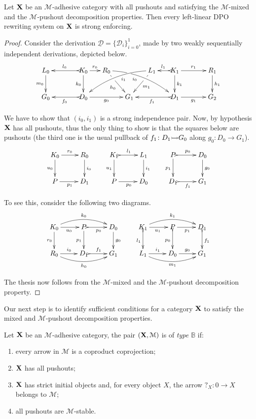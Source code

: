 \documentclass[a4paper,UKenglish,cleveref,pdftex, thm-restate,numberwithinsect,anonymous]{lipics}
\newcommand{\mto}[0]{\scalebox{1}{$\rightarrowtail$}}
\def\X{\textbf {\textup{X}}}
\def\G{\textbf {\textup{G}}}
\newcommand{\dder}[1]{\mathscr{#1}}
\newcommand{\der}[1]{\underline{\dder{#1}}}
\begin{document}
\begin{theorem}\label{thm:good1}Let $\X$ be an $\mathcal{M}$-adhesive category with all pushouts and satisfying the $\mathcal{M}$-mixed and the $\mathcal{M}$-pushout decomposition properties. Then every left-linear DPO rewriting system on $\X$ is strong enforcing.
\end{theorem}
\begin{proof}
	Consider the derivation $\der{D}=\{\dder{D}_i\}_{i=0}^1$, made by two weakly sequentially independent derivations, depicted below.
	\[\xymatrix@C=15pt{L_0 \ar[d]_{m_0}&& K_0 \ar[d]_{k_0}\ar@{>->}[ll]_{l_0} \ar[r]^{r_0} & R_0 \ar@/^.35cm/[drrr]|(.3)\hole_(.4){i_0} \ar[dr]|(.3)\hole_{h_0} && L_1 \ar@/_.35cm/[dlll]^(.4){i_1} \ar[dl]|(.3)\hole^{m_1}& K_1 \ar[d]^{k_1}\ar@{>->}[l]_{l_1} \ar[rr]^{r_1} && R_1 \ar[d]^{h_1} \\G_0 && \ar@{>->}[ll]^{f_0} D_0 \ar[rr]_{g_0}&& G_1  && \ar@{>->}[ll]^{f_1} D_1 \ar[rr]_{g_1}&& G_2 }\]

	We have to show that $(i_0, i_1)$ is a strong independence pair. Now, by hypothesis $\X$ has all pushouts, thus the only thing to show is that the squares below are pushouts (the third one is the usual pullback of $f_1\colon D_1\mto G_0$ along $g_0\colon D_0\to G_1$).
	\[\xymatrix{K_0 \ar[r]^{r_0}  \ar[d]_{u_0}& R_0 \ar[d]^{i_0} & K_1 \ar@{>->}[r]^{l_1}  \ar[d]_{u_1}& L_1 \ar[d]^{i_1}&P \ar@{>->}[r]^{p_0} \ar[d]_{p_1}& D_0\ar[d]^{g_0} \\ P \ar[r]_{p_1} & D_1 &P \ar[r]_{p_0}  & D_0&D_1 \ar@{>->}[r]_{f_1} & G_1}\]

	To see this, consider the following two diagrams.
	\[\xymatrix{K_0 \ar@/^.4cm/[rr]^{k_0} \ar[d]_{r_0} \ar[r]_{u_0}& \ar@{>->}[r]_{p_0} P \ar[d]_{p_1}& D_0 \ar[d]^{g_0}&K_1 \ar@/^.4cm/[rr]^{k_1} \ar@{>->}[d]_{l_1} \ar[r]_{u_1}& \ar[r]_{p_1} P \ar@{>->}[d]_{p_0}& D_1 \ar@{>->}[d]^{f_1}\\ R_0 \ar@/_.4cm/[rr]_{h_0}  \ar[r]^{i_0}& D_1 \ar@{>->}[r]^{f_1}& G_1 &L_1 \ar@/_.4cm/[rr]_{m_1}  \ar[r]^{i_1}& D_0 \ar[r]^{g_0}& G_1}\]

	The thesis now follows from the $\mathcal{M}$-mixed and the $\mathcal{M}$-pushout decomposition property.
\end{proof}

Our next step is to identify sufficient conditions for a category $\X$ to satisfy the mixed and $\mathcal{M}$-pushout decomposition properties.

\begin{definition} 
	Let $\X$ be an  $\mathcal{M}$-adhesive category, the pair $(\X, \mathcal{M})$ is of \emph{type $\mathbb{B}$} if:
	\begin{enumerate}
		\item every arrow in $\mathcal{M}$ is a coproduct coprojection;
		\item $\X$ has all pushouts;
		\item $\X$ has strict initial objects and, for every object $X$, the arrow $?_X\colon 0\to X $ belongs to $\mathcal{M}$;
		\item all pushouts are $\mathcal{M}$-stable.
	\end{enumerate}
\end{definition}
\end{document}
